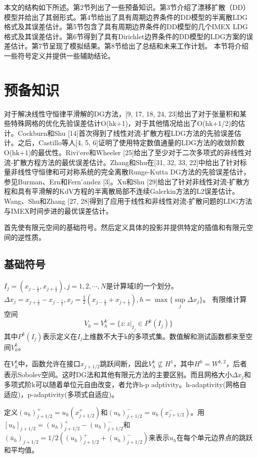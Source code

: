 \documentclass[lang=cn,newtx,10pt,scheme=chinese]{elegantbook}
\begin{document}
本文的结构如下所述。第2节列出了一些预备知识。第3节介绍了漂移扩散（DD）模型并给出了其弱形式。第4节给出了具有周期边界条件的DD模型的半离散LDG格式及其误差估计。第5节包含了具有周期边界条件的DD模型的几个IMEX LDG格式及其误差估计。第6节得到了具有Dirichlet边界条件的DD模型的LDG方案的误差估计。第7节呈现了模拟结果。第8节给出了总结和未来工作计划。
本节将介绍一些符号定义并提供一些辅助结论。

\chapter{预备知识}对于解决线性守恒律平滑解的DG方法，[9, 17, 18, 24, 23]给出了对于张量积和某些特殊网格的优化先验误差估计O(hk+1)，对于其他情况给出了O(hk+1/2)的估计。Cockburn和Shu [14]首次得到了线性对流-扩散方程LDG方法的先验误差估计。之后，Castillo等人[4, 5, 6]证明了使用特定数值通量的LDG方法的收敛阶数O(hk+1)的最优性。Rivi`ere和Wheeler [25]给出了至少对于二次多项式的非线性对流-扩散方程方法的最优误差估计。Zhang和Shu在[31, 32, 33, 22]中给出了针对标量非线性守恒律和可对称系统的完全离散Runge-Kutta DG方法的先验误差估计，参见Burman、Ern和Fern ́andez [3]。Xu和Shu [29]给出了针对非线性对流-扩散方程和具有平滑解的KdV方程的半离散局部不连续Galerkin方法的L2误差估计。Wang、Shu和Zhang [27, 28]得到了应用于线性和非线性对流-扩散问题的LDG方法与IMEX时间步进的最优误差估计。



首先使有限元空间的基础符号。然后定义具体的投影并提供特定的插值和有限元空间的逆性质。
\section{基础符号}
$I_j = (x_{j-\frac{1}{2}},x_{j+\frac{1}{2}}),j=1,2,\cdots,N$是计算域I的一个划分。$\Delta x_j = x_{j+\frac{1}{2}}-x_{j-\frac{1}{2}},x_j = \frac{1}{2}(x_{j-\frac{1}{2}}+x_{j+\frac{1}{2}}), h = \max\{\sup\limits_{j} \Delta x_j\}$。
有限维计算空间
\begin{equation*}
    V_h = V_h^k = \{z:z|_{I_j} \in P^k(I_j)\}
\end{equation*}
其中$P^k(I_j)$表示定义在$I_j$上维数不大于k的多项式集。数值解和测试函数都来至空间$V_h^k$。
\begin{note}
    在$V_h^k$中，函数允许在接口$x_{j+1/2}$跳跃间断，因此$V_h^k \not\subseteq H^1$，其中$H^k = W^{k,2}$，后者表示Sobolev空间。这时DG法和其他有限元方法的主要区别。而且网格大小$\Delta x_j$和多项式阶k可以随着单位元自由改变，者允许h-p adptivity。h-adaptivity(网格自适应)，p-adaptivity(多项式自适应)。
\end{note}
定义$(u_h)^+_{j+1/2} = u_h(x^+_{j+1/2})$和$(u_h)^-_{j+1/2} = u_h(x^-_{j+1/2})$。用$[u_h]_{j+1/2} = (u_h)^+_{j+1/2} - (u_h)^-_{j+1/2}$和$(\bar{u}_h)_{j+1/2}=1/2((u_h)^+_{j+1/2}+(u_h)^-_{j+1/2})$来表示$u_h$在每个单元边界点的跳跃和平均值。
\end{document}
